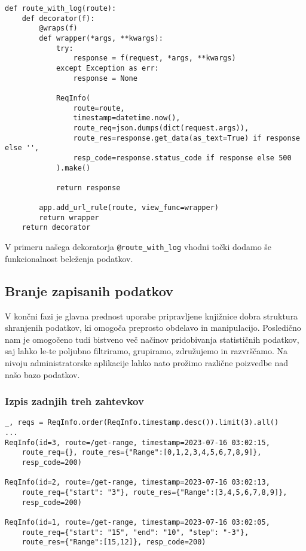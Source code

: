 \documentclass[a4paper,12pt,openright]{book}
\begin{document}
\begin{verbatim}
def route_with_log(route):
    def decorator(f):
        @wraps(f)
        def wrapper(*args, **kwargs):
            try:
                response = f(request, *args, **kwargs)
            except Exception as err:
                response = None

            ReqInfo(
                route=route,
                timestamp=datetime.now(),
                route_req=json.dumps(dict(request.args)),
                route_res=response.get_data(as_text=True) if response else '',
                resp_code=response.status_code if response else 500
            ).make()

            return response
        
        app.add_url_rule(route, view_func=wrapper)
        return wrapper
    return decorator
\end{verbatim}

    \noindent
    V primeru našega dekoratorja {\tt @route\_with\_log} vhodni točki dodamo še funkcionalnost beleženja podatkov.

    \subsection{Branje zapisanih podatkov}

    V končni fazi je glavna prednost uporabe pripravljene knjižnice dobra struktura shranjenih podatkov, ki omogoča preprosto obdelavo in manipulacijo. Posledično nam je omogočeno tudi bistveno več načinov pridobivanja statističnih podatkov, saj lahko le-te poljubno filtriramo, grupiramo, združujemo in razvrščamo. Na nivoju administratorske aplikacije lahko nato prožimo različne poizvedbe nad našo bazo podatkov.

    \subsubsection{Izpis zadnjih treh zahtevkov}

\begin{verbatim}
_, reqs = ReqInfo.order(ReqInfo.timestamp.desc()).limit(3).all()
... 
ReqInfo(id=3, route=/get-range, timestamp=2023-07-16 03:02:15, 
    route_req={}, route_res={"Range":[0,1,2,3,4,5,6,7,8,9]},
    resp_code=200)
    
ReqInfo(id=2, route=/get-range, timestamp=2023-07-16 03:02:13, 
    route_req={"start": "3"}, route_res={"Range":[3,4,5,6,7,8,9]},
    resp_code=200)
    
ReqInfo(id=1, route=/get-range, timestamp=2023-07-16 03:02:05,
    route_req={"start": "15", "end": "10", "step": "-3"},
    route_res={"Range":[15,12]}, resp_code=200)
\end{verbatim}
\end{document}
